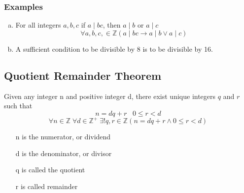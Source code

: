 \documentclass[12pt]{book}
\newcommand{\Z}{\mathbb{Z}}
\newcommand{\paren}[1]{\left( #1 \right)}
\begin{document}
\subsubsection{Examples}
\begin{enumerate}[a.]
    \item For all integers $a,b,c$ if $a \mid bc$, then $a\mid b$ or $a\mid c$ 
        \[
        \forall a,b,c, \in \Z \paren{a \mid bc \rightarrow a\mid b \vee a \mid c}
        \]
    \item A sufficient condition to be divisible by 8 is to be divisible by 16.
\end{enumerate}

\subsection{Quotient Remainder Theorem}
Given any integer n and positive integer d, there exist unique integers $q$ and $r$ such that 
\[
n = dq + r \;\;\; 0\leq r < d
\]
\[
\forall n \in \Z \; \forall d \in \Z^+ \; \exists! q,r \in \Z 
\paren{n = dq+r \wedge 0 \leq r < d}
\]
\begin{enumerate}
    \item[n] is the numerator, or dividend
    \item[d] is the denominator, or divisor
    \item[q] is called the quotient
    \item[r] is called remainder
\end{enumerate}
\end{document}
